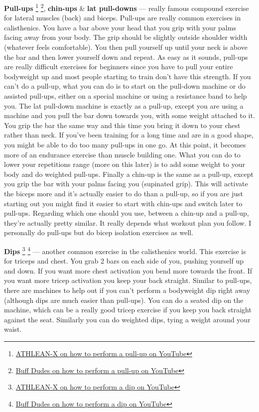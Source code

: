 \documentclass[openany, 12pt]{book}
\begin{document}
        \textbf{Pull-ups}
        \footnote{\href{https://www.youtube.com/watch?v=sIvJTfGxdFo}{ATHLEAN-X on how to perform a pull-up on YouTube}}
        \footnote{\href{https://www.youtube.com/watch?v=vw5Xmu5CIew}{Buff Dudes on how to perform a pull-up on YouTube}},
        \textbf{chin-ups} \& \textbf{lat pull-downs}
        --- really famous compound exercise for lateral muscles (back) and biceps. Pull-ups are really common exercises in calisthenics. You have a bar above your head that you grip with your palms facing
        away from your body. The grip should be slightly outside shoulder width (whatever feels comfortable). You then pull yourself up until your neck is above the bar and then lower yourself down and
        repeat. As easy as it sounds, pull-ups are really difficult exercises for beginners since you have to pull your entire bodyweight up and most people starting to train don't have this strength.
        If you can't do a pull-up, what you can do is to start on the pull-down machine or do assisted pull-ups, either on a special machine or using
        a resistance band to help you. The lat pull-down machine is exactly as a pull-up, except you are using a machine and you pull the bar down towards you, with some weight attached to it.
        You grip the bar the same way and this time you bring it down to your chest rather than neck.
        If you've been training for a long time and are in a good shape, you might be able to do too many pull-ups in one go. At this point, it
        becomes more of an endurance exercise than muscle building one. What you can do to lower your repetitions range (more on this later) is to add some weight to your body and do weighted
        pull-ups. Finally a chin-up is the same as a pull-up, except you grip the bar with your palms facing you (supinated grip). This will activate the biceps more and it's actually easier to
        do than a pull-up, so if you are just starting out you might find it easier to start with chin-ups and switch later to pull-ups. Regarding which one should you use, between a chin-up and
        a pull-up, they're actually pretty similar. It really depends what workout plan you follow. I personally do pull-ups but do bicep isolation exercises as well.

        \textbf{Dips}
        \footnote{\href{https://www.youtube.com/watch?v=vi1-BOcj3cQ}{ATHLEAN-X on how to perform a dip on YouTube}}
        \footnote{\href{https://www.youtube.com/watch?v=wjUmnZH528Y}{Buff Dudes on how to perform a dip on YouTube}}
        --- another common exercise in the calisthenics world. This exercise is for triceps and chest. You grab 2 bars on each side of you, pushing yourself up and down.
        If you want more chest activation you bend more towards the front. If you want more tricep activation you keep your back straight. Similar to pull-ups, there are machines to
        help out if you can't perform a bodyweight dip right away (although dips are much easier than pull-ups). You can do a seated dip on the machine, which can be a really good
        tricep exercise if you keep you back straight against the seat. Similarly you can do weighted dips, tying a weight around your waist.
\end{document}
